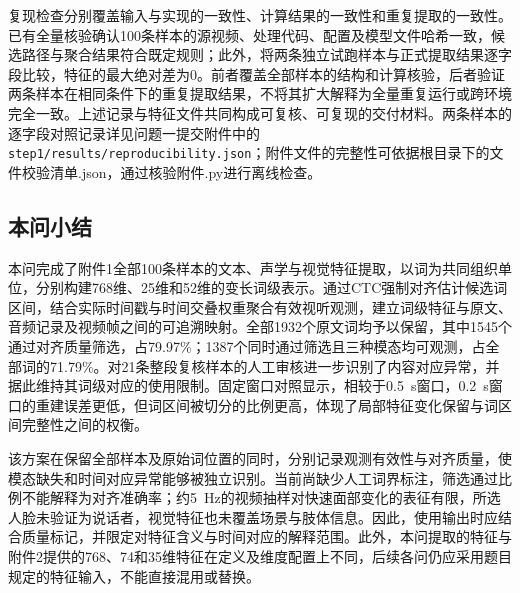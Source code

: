 复现检查分别覆盖输入与实现的一致性、计算结果的一致性和重复提取的一致性。已有全量核验确认100条样本的源视频、处理代码、配置及模型文件哈希一致，候选路径与聚合结果符合既定规则；此外，将两条独立试跑样本与正式提取结果逐字段比较，特征的最大绝对差为0。前者覆盖全部样本的结构和计算核验，后者验证两条样本在相同条件下的重复提取结果，不将其扩大解释为全量重复运行或跨环境完全一致。上述记录与特征文件共同构成可复核、可复现的交付材料。两条样本的逐字段对照记录详见问题一提交附件中的\nolinkurl{step1/results/reproducibility.json}；附件文件的完整性可依据根目录下的\textnormal{文件校验清单.json}，通过\textnormal{核验附件.py}进行离线检查。




\subsection{本问小结}

本问完成了附件1全部100条样本的文本、声学与视觉特征提取，以词为共同组织单位，分别构建768维、25维和52维的变长词级表示。通过CTC强制对齐估计候选词区间，结合实际时间戳与时间交叠权重聚合有效视听观测，建立词级特征与原文、音频记录及视频帧之间的可追溯映射。全部1932个原文词均予以保留，其中1545个通过对齐质量筛选，占79.97\%；1387个同时通过筛选且三种模态均可观测，占全部词的71.79\%。对21条整段复核样本的人工审核进一步识别了内容对应异常，并据此维持其词级对应的使用限制。固定窗口对照显示，相较于0.5~s窗口，0.2~s窗口的重建误差更低，但词区间被切分的比例更高，体现了局部特征变化保留与词区间完整性之间的权衡。

该方案在保留全部样本及原始词位置的同时，分别记录观测有效性与对齐质量，使模态缺失和时间对应异常能够被独立识别。当前尚缺少人工词界标注，筛选通过比例不能解释为对齐准确率；约5~Hz的视频抽样对快速面部变化的表征有限，所选人脸未验证为说话者，视觉特征也未覆盖场景与肢体信息。因此，使用输出时应结合质量标记，并限定对特征含义与时间对应的解释范围。此外，本问提取的特征与附件2提供的768、74和35维特征在定义及维度配置上不同，后续各问仍应采用题目规定的特征输入，不能直接混用或替换。
